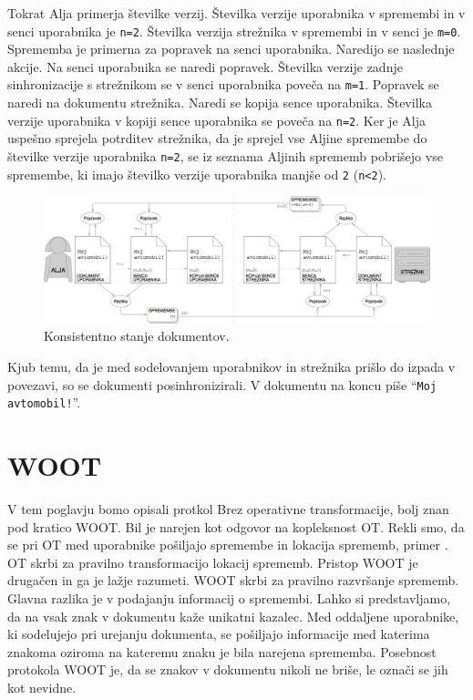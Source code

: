 \documentclass[a4paper, 12pt, twoside]{book}
\begin{document}
Tokrat Alja primerja številke verzij. Številka verzije uporabnika v spremembi in v senci uporabnika je {\tt n=2}. Številka verzija strežnika v spremembi in v senci je {\tt m=0}. Sprememba je primerna za popravek na senci uporabnika. Naredijo se naslednje akcije. Na senci uporabnika se naredi popravek. Številka verzije zadnje sinhronizacije s strežnikom se v senci uporabnika poveča na {\tt m=1}. Popravek se naredi na dokumentu strežnika. Naredi se kopija sence uporabnika. Številka verzije uporabnika v kopiji sence uporabnika se poveča na {\tt n=2}. Ker je Alja uspešno sprejela potrditev strežnika, da je sprejel vse Aljine spremembe do številke verzije uporabnika {\tt n=2}, se iz seznama Aljinih sprememb pobrišejo vse spremembe, ki imajo številko verzije uporabnika manjše od {\tt 2} ({\tt n<2}).

\begin{figure}[placement h]
\begin{center}
\includegraphics[width=16cm]{ds10.png}
\end{center}
\caption{Konsistentno stanje dokumentov.}
\label{ds10}
\end{figure}

Kjub temu, da je med sodelovanjem uporabnikov in strežnika prišlo do izpada v povezavi, so se dokumenti posinhronizirali. V dokumentu na koncu piše “{\tt Moj avtomobil!}”.


\section{WOOT}

V tem poglavju bomo opisali protkol Brez operativne transformacije, bolj znan pod kratico WOOT. Bil je narejen kot odgovor na kopleksnost OT. Rekli smo, da se pri OT med uporabnike pošiljajo spremembe in lokacija sprememb, primer . OT skrbi za pravilno transformacijo lokacij sprememb. Pristop WOOT je drugačen in ga je lažje razumeti. WOOT skrbi za pravilno razvršanje sprememb. Glavna razlika je v podajanju informacij o spremembi. Lahko si predstavljamo, da na vsak znak v dokumentu kaže unikatni kazalec. Med oddaljene uporabnike, ki sodelujejo pri urejanju dokumenta, se pošiljajo informacije med katerima znakoma oziroma na kateremu znaku je bila narejena sprememba. Posebnost protokola WOOT je, da se znakov v dokumentu nikoli ne briše, le označi se jih kot nevidne.
\end{document}
